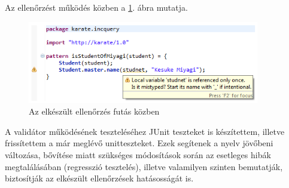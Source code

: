 Az ellenőrzést működés közben a \ref{fig:unusedLive}. ábra mutatja.
\begin{figure}[!t]
\centering
\includegraphics[width=0.90\textwidth]{figures/unused-variable-detection-warning.png}
\caption{Az elkészült ellenőrzés futás közben}
\label{fig:unusedLive}
\end{figure}

A validátor működésének teszteléséhez JUnit teszteket is készítettem, illetve frissítettem a már meglévő unitteszteket. Ezek segítenek a nyelv jövőbeni változása, bővítése miatt szükséges módosítások során az esetleges hibák megtalálásában (regresszió tesztelés), illetve valamilyen szinten bemutatják, biztosítják az elkészült ellenőrzések hatásosságát is.
